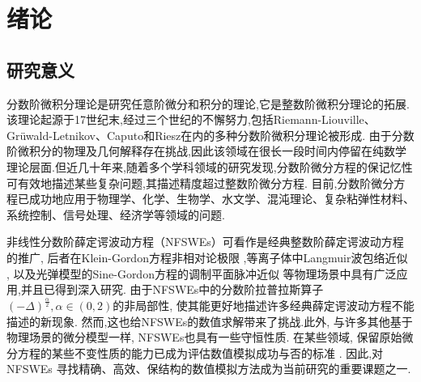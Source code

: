\chapter[绪论]{绪论}

\section{研究意义}

分数阶微积分理论是研究任意阶微分和积分的理论,它是整数阶微积分理论的拓展.该理论起源于17世纪末,经过三个世纪的不懈努力,包括Riemann-Liouville、Grüwald-Letnikov、Caputo和Riesz在内的多种分数阶微积分理论被形成\cite{samkoFractionalIntegralsDerivatives1993}.
由于分数阶微积分的物理及几何解释存在挑战,因此该领域在很长一段时间内停留在纯数学理论层面.但近几十年来,随着多个学科领域的研究发现,分数阶微分方程的保记忆性可有效地描述某些复杂问题,其描述精度超过整数阶微分方程.
目前,分数阶微分方程已成功地应用于物理学、化学、生物学、水文学、混沌理论、复杂粘弹性材料、系统控制、信号处理、经济学等领域的问题\cite{liIntroductionFractionalCalculus2015,HandbookDifferentialEquations2008,brychkovIndefiniteIntegrals2008,zhangMassBalanceBased2005,carrerasAnomalousDiffusionExit2001,hilferFRACTIONALCALCULUSREGULAR2000,maginSolvingFractionalOrder2009,zaslavskySelfsimilarTransportIncomplete1993,sunRandomorderFractionalDifferential2011}.

非线性分数阶薛定谔波动方程（NFSWEs）可看作是经典整数阶薛定谔波动方程的推广,
后者在Klein-Gordon方程非相对论极限 \cite{tsutsumiNonrelativisticApproximationNonlinear1984,machiharaNonrelativisticLimitEnergy2002},等离子体中Langmuir波包络近似 \cite{colinSemidiscretizationTimeNonlinear1998},
以及光弹模型的Sine-Gordon方程的调制平面脉冲近似 \cite{baoComparisonsSineGordonPerturbed2010,xinModelingLightBullets2000}等物理场景中具有广泛应用,并且已得到深入研究\cite{zhangConservativeNumericalScheme2003,baoUniformErrorEstimates2012,chengSeveralConservativeCompact2018,brugnanoClassEnergyconservingHamiltonian2018}.
由于NFSWEs中的分数阶拉普拉斯算子 $(-\Delta)^{\frac{\alpha}{2}}, \alpha \in(0,2)$的非局部性, 使其能更好地描述许多经典薛定谔波动方程不能描述的新现象.
然而,这也给NFSWEs的数值求解带来了挑战.此外, 与许多其他基于物理场景的微分模型一样, NFSWEs也具有一些守恒性质. 
在某些领域, 保留原始微分方程的某些不变性质的能力已成为评估数值模拟成功与否的标准 \cite{liFiniteDifferenceCalculus1995}.
因此,对 NFSWEs 寻找精确、高效、保结构的数值模拟方法成为当前研究的重要课题之一.


